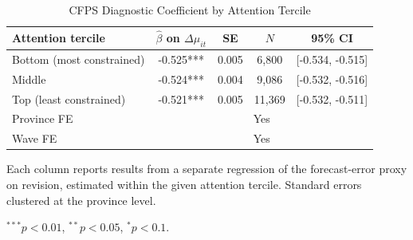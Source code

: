 \begin{table}[!htbp]
\centering
\caption{CFPS Diagnostic Coefficient by Attention Tercile}
\label{tab:cfps_monotonicity}
\begin{threeparttable}
\begin{tabular}{lcccc}
\toprule
Attention tercile & $\hat{\beta}$ on $\Delta \mu_{it}$ & SE & $N$ & 95\% CI \\
\midrule
Bottom (most constrained) & -0.525*** & 0.005 & 6,800 & [-0.534, -0.515] \\
Middle & -0.524*** & 0.004 & 9,086 & [-0.532, -0.516] \\
Top (least constrained) & -0.521*** & 0.005 & 11,369 & [-0.532, -0.511] \\
\midrule
Province FE & \multicolumn{4}{c}{Yes} \\
Wave FE & \multicolumn{4}{c}{Yes} \\
\bottomrule
\end{tabular}
\begin{tablenotes}[flushleft]
\footnotesize
\item Each column reports results from a separate regression of the forecast-error proxy on revision,
estimated within the given attention tercile. Standard errors clustered at the province level.
\item $^{***}p<0.01$, $^{**}p<0.05$, $^{*}p<0.1$.
\end{tablenotes}
\end{threeparttable}
\end{table}
